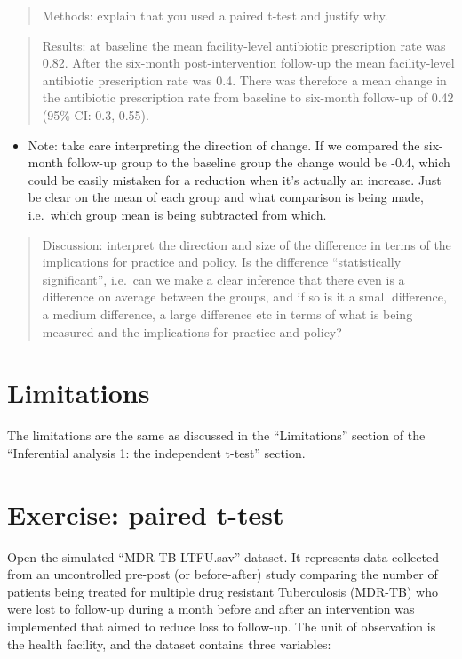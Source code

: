 \documentclass[
]{book}
\providecommand{\tightlist}{%
  \setlength{\itemsep}{0pt}\setlength{\parskip}{0pt}}
\begin{document}
\begin{quote}
Methods: explain that you used a paired t-test and justify why.
\end{quote}

\begin{quote}
Results: at baseline the mean facility-level antibiotic prescription rate was 0.82. After the six-month post-intervention follow-up the mean facility-level antibiotic prescription rate was 0.4. There was therefore a mean change in the antibiotic prescription rate from baseline to six-month follow-up of 0.42 (95\% CI: 0.3, 0.55).
\end{quote}

\begin{itemize}
\tightlist
\item
  Note: take care interpreting the direction of change. If we compared the six-month follow-up group to the baseline group the change would be -0.4, which could be easily mistaken for a reduction when it's actually an increase. Just be clear on the mean of each group and what comparison is being made, i.e.~which group mean is being subtracted from which.
\end{itemize}

\begin{quote}
Discussion: interpret the direction and size of the difference in terms of the implications for practice and policy. Is the difference ``statistically significant'', i.e.~can we make a clear inference that there even is a difference on average between the groups, and if so is it a small difference, a medium difference, a large difference etc in terms of what is being measured and the implications for practice and policy?
\end{quote}

\hypertarget{limitations-2}{%
\section{Limitations}\label{limitations-2}}

The limitations are the same as discussed in the ``Limitations'' section of the ``Inferential analysis 1: the independent t-test'' section.

\hypertarget{exercise-paired-t-test}{%
\section{Exercise: paired t-test}\label{exercise-paired-t-test}}

Open the simulated ``MDR-TB LTFU.sav'' dataset. It represents data collected from an uncontrolled pre-post (or before-after) study comparing the number of patients being treated for multiple drug resistant Tuberculosis (MDR-TB) who were lost to follow-up during a month before and after an intervention was implemented that aimed to reduce loss to follow-up. The unit of observation is the health facility, and the dataset contains three variables:
\end{document}
